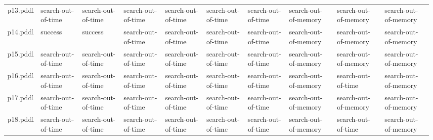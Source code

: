 \documentclass{article}
\begin{document}
\begin{tabular}{@{}lrrrrrrrrr@{}}
p13.pddl & \multicolumn{1}{|l|}{search-out-of-time} & \multicolumn{1}{|l|}{search-out-of-time} & \multicolumn{1}{|l|}{search-out-of-time} & \multicolumn{1}{|l|}{search-out-of-time} & \multicolumn{1}{|l|}{search-out-of-time} & \multicolumn{1}{|l|}{search-out-of-time} & \multicolumn{1}{|l|}{search-out-of-memory} & \multicolumn{1}{|l|}{search-out-of-memory} & \multicolumn{1}{|l|}{search-out-of-memory} \\
p14.pddl & \multicolumn{1}{|l|}{success} & \multicolumn{1}{|l|}{success} & \multicolumn{1}{|l|}{search-out-of-time} & \multicolumn{1}{|l|}{search-out-of-time} & \multicolumn{1}{|l|}{search-out-of-time} & \multicolumn{1}{|l|}{search-out-of-time} & \multicolumn{1}{|l|}{search-out-of-memory} & \multicolumn{1}{|l|}{search-out-of-memory} & \multicolumn{1}{|l|}{search-out-of-memory} \\
p15.pddl & \multicolumn{1}{|l|}{search-out-of-time} & \multicolumn{1}{|l|}{search-out-of-time} & \multicolumn{1}{|l|}{search-out-of-time} & \multicolumn{1}{|l|}{search-out-of-time} & \multicolumn{1}{|l|}{search-out-of-time} & \multicolumn{1}{|l|}{search-out-of-time} & \multicolumn{1}{|l|}{search-out-of-memory} & \multicolumn{1}{|l|}{search-out-of-memory} & \multicolumn{1}{|l|}{search-out-of-memory} \\
p16.pddl & \multicolumn{1}{|l|}{search-out-of-time} & \multicolumn{1}{|l|}{search-out-of-time} & \multicolumn{1}{|l|}{search-out-of-time} & \multicolumn{1}{|l|}{search-out-of-time} & \multicolumn{1}{|l|}{search-out-of-time} & \multicolumn{1}{|l|}{search-out-of-time} & \multicolumn{1}{|l|}{search-out-of-memory} & \multicolumn{1}{|l|}{search-out-of-time} & \multicolumn{1}{|l|}{search-out-of-memory} \\
p17.pddl & \multicolumn{1}{|l|}{search-out-of-time} & \multicolumn{1}{|l|}{search-out-of-time} & \multicolumn{1}{|l|}{search-out-of-time} & \multicolumn{1}{|l|}{search-out-of-time} & \multicolumn{1}{|l|}{search-out-of-time} & \multicolumn{1}{|l|}{search-out-of-time} & \multicolumn{1}{|l|}{search-out-of-memory} & \multicolumn{1}{|l|}{search-out-of-memory} & \multicolumn{1}{|l|}{search-out-of-memory} \\
p18.pddl & \multicolumn{1}{|l|}{search-out-of-time} & \multicolumn{1}{|l|}{search-out-of-time} & \multicolumn{1}{|l|}{search-out-of-time} & \multicolumn{1}{|l|}{search-out-of-time} & \multicolumn{1}{|l|}{search-out-of-time} & \multicolumn{1}{|l|}{search-out-of-time} & \multicolumn{1}{|l|}{search-out-of-memory} & \multicolumn{1}{|l|}{search-out-of-time} & \multicolumn{1}{|l|}{search-out-of-memory} \\

\end{tabular}
\end{document}
